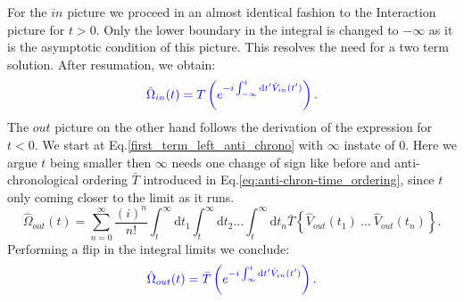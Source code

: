 \documentclass[
12pt, %
english, %
singlespacing, %
headsepline, %
]{MastersDoctoralThesis} %
\begin{document}
For the $ in $ picture we proceed in an almost identical fashion to the Interaction picture for $ t > 0 $. Only the lower boundary in the integral is changed to $ -\infty $ as it is the asymptotic condition of this picture. This resolves the need for a two term solution. 
After resumation, we obtain:
\begin{equation}\label{eq:Omega_in_converg}
\textcolor[RGB]{0,0,204}{
\hat{\Omega}_{in}(t)
= T\left( e^{-i\int_{-\infty}^{t}\mathrm{d}t^{\prime} \hat{V}_{in}(t^{\prime})} \right)
	.}
\end{equation}
The $ out $ picture on the other hand follows the derivation of the expression for $ t < 0 $. We start at Eq.\enskip\eqref{first_term_left_anti_chrono} with $ \infty $ instate of $ 0 $. Here we argue $ t $ being smaller then $ \infty $ needs one change of sign like before and anti-chronological ordering $ \bar{T} $ introduced in Eq.\enskip\eqref{eq:anti-chron-time_ordering}, since $ t $ only coming closer to the limit as it runs.
\begin{equation}
\hat{\Omega}_{out}(t) =
\sum\limits_{n=0}^{\infty} 
\frac{(i)^{n}}{n!}
\int^{\infty}_{t}\mathrm{d}t_1\int^{\infty}_{t}\! \! \mathrm{d}t_2
 \ldots
 \int^{\infty}_{t}\! \! \mathrm{d}t_n
 \bar{T}\left\lbrace \hat{V}_{out}(t_1)\ \ldots \ \hat{V}_{out}(t_n)\right\rbrace .
\end{equation}
Performing a flip in the integral limits we conclude:
\begin{equation}\label{eq:Omega_out_converg}
\textcolor[RGB]{0,0,204}{
\hat{\Omega}_{out}(t)
= \bar{T}\left( e^{-i\int_{\infty}^{t}\mathrm{d}t^{\prime} \hat{V}_{in}(t^{\prime})} \right)
	.}
\end{equation}
\end{document}
